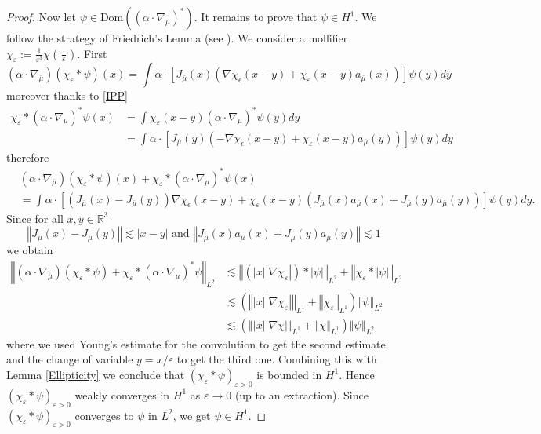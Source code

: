 \documentclass[a4paper, 12pt]{amsart}
\numberwithin{equation}{section}
\newcommand{\R}{\mathbb{R}} %
\newcommand{\lp}{\left(} %
\newcommand{\rp}{\right)} %
\newcommand{\lv}{\left\vert} %
\newcommand{\rv}{\right\vert} %
\newcommand{\lV}{\left\Vert} %
\newcommand{\rV}{\right\Vert} %
\newcommand{\Dom}{\mathrm{Dom}} %
\begin{document}
\begin{proof}
    Now let $\psi\in\Dom((\alpha\cdot\nabla_\mu)^*)$. It remains to prove that $\psi\in H^1$. We follow the strategy of Friedrich's Lemma (see \cite[Lemma 17.1.5]{Ho03}). We consider a mollifier $\chi_\varepsilon:=\frac{1}{\varepsilon^3}\chi\lp\frac{\cdot}{\varepsilon}\rp$. First
    \[(\alpha\cdot\nabla_{\overline{\mu}})(\chi_\varepsilon*\psi)(x)=\int\alpha\cdot[ J_{\overline{\mu}}(x)(\nabla\chi_\epsilon(x-y)+\chi_\varepsilon(x-y)a_{\overline{\mu}}(x))]\psi(y)dy\]
    moreover thanks to \eqref{IPP}
    \begin{align*}
        \chi_\varepsilon*(\alpha\cdot\nabla_\mu)^*\psi(x)&=\int\chi_\varepsilon(x-y)(\alpha\cdot\nabla_\mu)^*\psi(y)dy\\
        &=\int\alpha\cdot[ J_{\overline{\mu}}(y)(-\nabla\chi_\epsilon(x-y)+\chi_\varepsilon(x-y)a_{\overline{\mu}}(y))]\psi(y)dy
    \end{align*}
    therefore 
    \begin{align*}
        &(\alpha\cdot\nabla_{\overline{\mu}})(\chi_\varepsilon*\psi)(x)+\chi_\varepsilon*(\alpha\cdot\nabla_\mu)^*\psi(x)\\
        &=\int\alpha\cdot[(J_{\overline{\mu}}(x)-J_{\overline{\mu}}(y))\nabla\chi_\epsilon(x-y)+\chi_\varepsilon(x-y)(J_{\overline{\mu}}(x)a_{\overline{\mu}}(x)+J_{\overline{\mu}}(y)a_{\overline{\mu}}(y))]\psi(y)dy.
    \end{align*}
    Since for all $x,y\in\R^3$
    \[\lV J_{\overline{\mu}}(x)-J_{\overline{\mu}}(y)\rV\lesssim\lv x-y\rv \mbox{ and } \lV J_{\overline{\mu}}(x)a_{\overline{\mu}}(x)+J_{\overline{\mu}}(y)a_{\overline{\mu}}(y)\rV\lesssim 1\]
    we obtain
    \begin{align*}
        \lV(\alpha\cdot\nabla_{\overline{\mu}})(\chi_\varepsilon*\psi)+\chi_\varepsilon*(\alpha\cdot\nabla_\mu)^*\psi\rV_{L^2}&\lesssim \lV(\lv x\rv\lv \nabla\chi_\varepsilon\rv)*\lv\psi\rv\rV_{L^2}+\lV\chi_\varepsilon*\lv\psi\rv\rV_{L^2}\\
        &\lesssim(\lV\lv x\rv\lv \nabla\chi_\varepsilon\rv\rV_{L^1}+\lV\chi_\varepsilon\rV_{L^1})\lV\psi\rV_{L^2}\\
        &\lesssim(\lV\lv x\rv\lv \nabla\chi\rv\rV_{L^1}+\lV\chi\rV_{L^1})\lV\psi\rV_{L^2}
    \end{align*}
    where we used Young's estimate for the convolution to get the second estimate and the change of variable $y=x/\varepsilon$ to get the third one. Combining this with Lemma \ref{Ellipticity} we conclude that $(\chi_\varepsilon*\psi)_{\varepsilon>0}$ is bounded in $H^1$. Hence $(\chi_\varepsilon*\psi)_{\varepsilon>0}$ weakly converges in $H^1$ as $\varepsilon\rightarrow0$ (up to an extraction). Since $(\chi_\varepsilon*\psi)_{\varepsilon>0}$ converges to $\psi$ in $L^2$, we get $\psi\in H^1$. 
\end{proof}
\end{document}
